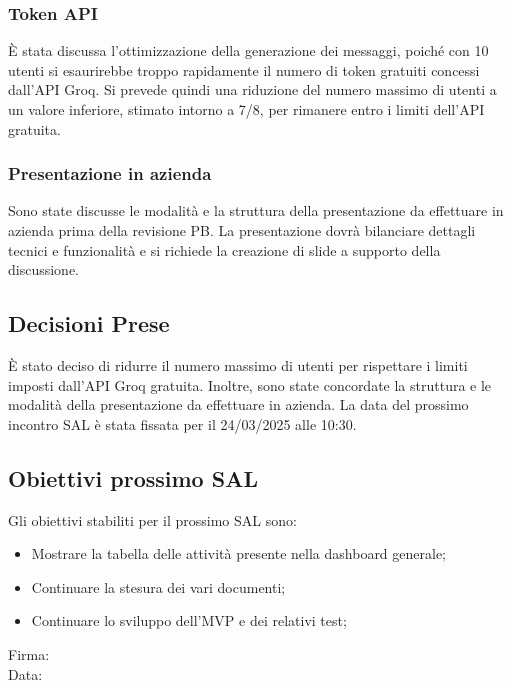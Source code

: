 \documentclass[10pt]{article}
\begin{document}
    \subsubsection{Token API}
    È stata discussa l'ottimizzazione della generazione dei messaggi, poiché con 10 utenti si esaurirebbe troppo rapidamente il numero di token gratuiti concessi dall'API Groq. Si prevede quindi una riduzione del numero massimo di utenti a un valore inferiore, stimato intorno a 7/8, per rimanere entro i limiti dell'API gratuita.

    \subsubsection{Presentazione in azienda}
    Sono state discusse le modalità e la struttura della presentazione da effettuare in azienda prima della revisione PB. La presentazione dovrà bilanciare dettagli tecnici e funzionalità e si richiede la creazione di slide a supporto della discussione.

\subsection{Decisioni Prese}
È stato deciso di ridurre il numero massimo di utenti per rispettare i limiti imposti dall'API Groq gratuita. Inoltre, sono state concordate la struttura e le modalità della presentazione da effettuare in azienda.
La data del prossimo incontro SAL è stata fissata per il 24/03/2025 alle 10:30.

\subsection{Obiettivi prossimo SAL} 
Gli obiettivi stabiliti per il prossimo SAL sono:
    \begin{itemize}
            \item Mostrare la tabella delle attività presente nella dashboard generale;
            \item Continuare la stesura dei vari documenti;
            \item Continuare lo sviluppo dell'MVP e dei relativi test;
    \end{itemize}

\vfill
\begin{minipage}{10cm}
Firma: \hrulefill \\
\vspace{2mm}
Data: \dotfill
\end{minipage}
\end{document}

